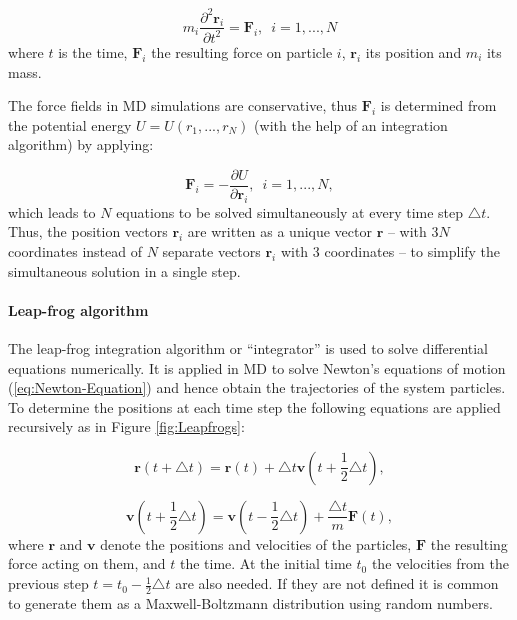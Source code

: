 \begin{equation}
m_{i}\frac{\partial^{2}\bm{r}_{i}}{\partial t^{2}}=\bm{F}_{i},\enspace i=1,...,N\label{eq:Newton-Equation}
\end{equation}
where $t$ is the time, $\bm{F}_{i}$ the resulting force on particle
$i$, $\bm{r}_{i}$ its position and $m_{i}$ its mass.

The force fields in MD simulations are conservative, thus $\bm{F}_{i}$
is determined from the potential energy $U=U(r_{1},...,r_{N})$ (with
the help of an integration algorithm) by applying:

\begin{equation}
\bm{F}_{i}=-\frac{\partial U}{\partial\mathbf{r}_{i}},\enspace i=1,...,N,\label{eq:Force-PotEnergy-derivative}
\end{equation}
which leads to $N$ equations to be solved simultaneously at every
time step $\triangle t$. Thus, the position vectors $\bm{r}_{i}$
are written as a unique vector $\mathbf{r}$ -- with $3N$ coordinates
instead of $N$ separate vectors $\bm{r}_{i}$ with 3 coordinates
-- to simplify the simultaneous solution in a single step.

\paragraph{Leap-frog algorithm }

The leap-frog integration algorithm or ``integrator'' is used to
solve differential equations numerically. It is applied in MD to solve
Newton's equations of motion (\ref{eq:Newton-Equation}) and hence
obtain the trajectories of the system particles. To determine the
positions at each time step the following equations are applied recursively
as in Figure \ref{fig:Leapfrogs}:

\begin{equation}
\mathbf{r}(t+\triangle t)=\mathbf{r}(t)+\triangle t\mathbf{v}(t+\frac{1}{2}\triangle t),\label{eq:leapfrog-r}
\end{equation}

\begin{equation}
\mathbf{v}(t+\frac{1}{2}\triangle t)=\mathbf{\mathbf{v}}(t-\frac{1}{2}\triangle t)+\frac{\triangle t}{m}\mathbf{F}(t),\label{eq:leapfrog-v}
\end{equation}
where $\mathbf{r}$ and $\mathbf{v}$ denote the positions and velocities
of the particles, $\mathbf{F}$ the resulting force acting on them,
and $t$ the time. At the initial time $t_{0}$ the velocities from
the previous step $t=t_{0}-\frac{1}{2}\triangle t$ are also needed.
If they are not defined it is common to generate them as a Maxwell-Boltzmann
distribution using random numbers.

